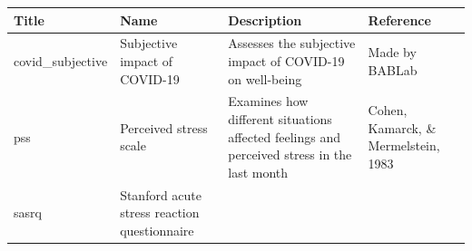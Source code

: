 \documentclass[]{book}
\begin{document}
\begin{longtable}[]{@{}llll@{}}
\toprule
\begin{minipage}[b]{0.22\columnwidth}\raggedright
Title\strut
\end{minipage} & \begin{minipage}[b]{0.27\columnwidth}\raggedright
Name\strut
\end{minipage} & \begin{minipage}[b]{0.22\columnwidth}\raggedright
Description\strut
\end{minipage} & \begin{minipage}[b]{0.18\columnwidth}\raggedright
Reference\strut
\end{minipage}\tabularnewline
\midrule
\endhead
\begin{minipage}[t]{0.22\columnwidth}\raggedright
covid\_subjective\strut
\end{minipage} & \begin{minipage}[t]{0.27\columnwidth}\raggedright
Subjective impact of COVID-19\strut
\end{minipage} & \begin{minipage}[t]{0.22\columnwidth}\raggedright
Assesses the subjective impact of COVID-19 on well-being\strut
\end{minipage} & \begin{minipage}[t]{0.18\columnwidth}\raggedright
Made by BABLab\strut
\end{minipage}\tabularnewline
\begin{minipage}[t]{0.22\columnwidth}\raggedright
pss\strut
\end{minipage} & \begin{minipage}[t]{0.27\columnwidth}\raggedright
Perceived stress scale\strut
\end{minipage} & \begin{minipage}[t]{0.22\columnwidth}\raggedright
Examines how different situations affected feelings and perceived stress in the last month\strut
\end{minipage} & \begin{minipage}[t]{0.18\columnwidth}\raggedright
Cohen, Kamarck, \& Mermelstein, 1983\strut
\end{minipage}\tabularnewline
\begin{minipage}[t]{0.22\columnwidth}\raggedright
sasrq\strut
\end{minipage} & \begin{minipage}[t]{0.27\columnwidth}\raggedright
Stanford acute stress reaction questionnaire\strut
\end{minipage} & \begin{minipage}[t]{0.22\columnwidth}\raggedright

\end{minipage}
\end{longtable}
\end{document}
